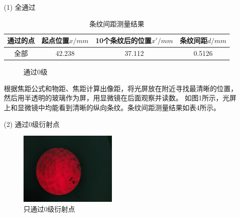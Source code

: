\documentclass{article}
\begin{document}
    \begin{enumerate}
        \item [(1)] 全通过 \\
        \begin{table}[htb]
            \centering
            \begin{tabular}{|c|c|c|c|}
                \hline
                通过的点 & 起点位置$x/mm$ & 10个条纹后的位置$x'/mm$ & 条纹间距$d/mm$ \\
                \hline
                全部 & 42.238 & 37.112 & 0.5126 \\
                \hline
            \end{tabular}
            \caption{条纹间距测量结果}
        \end{table}
        \begin{figure}[htb]
            \centering
            \caption{通过0级}
        \end{figure}

        根据焦距公式和物距、焦距计算出像距，将光屏放在附近寻找最清晰的位置，然后用半透明的玻璃作为屏，用显微镜在后面观察并读数。
        如图1所示，光屏上和显微镜中均能看到清晰的纵向条纹。条纹间距测量结果如表4所示。

        \item [(2)] 通过0级衍射点 \\
        \begin{figure}[htb]
            \centering
            \includegraphics[width=0.45\textwidth]{一维-0级通-屏.jpg}
            \caption{只通过0级衍射点}
        \end{figure}
        

\end{enumerate}
\end{document}
